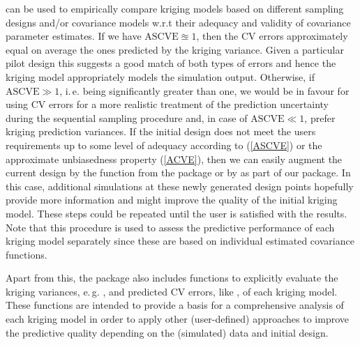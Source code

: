 \documentclass[article, nojss]{jss}
\numberwithin{equation}{section}			%
\begin{document}
can be used to empirically compare kriging models based on different sampling
designs and/or covariance models w.r.t their adequacy and validity of covariance
parameter estimates. If we have $\textrm{ASCVE}\approxeq 1$, then the CV errors
approximately equal on average the ones predicted by the kriging variance.
Given a particular pilot design this suggests a good match of both types of
errors and hence the kriging model appropriately models the simulation output.
Otherwise, if $\textrm{ASCVE}\gg 1$, i.\,e. being significantly greater than one, we would
be in favour for using CV errors for a more realistic treatment of the
prediction uncertainty during the sequential sampling procedure and, in case of
$\textrm{ASCVE}\ll 1$, prefer kriging prediction variances. If the initial
design does not meet the users requirements up to some level of adequacy
according to (\ref{ASCVE}) or the approximate unbiasedness property (\ref{ACVE}), then we can
easily augment the current design by the function  from the package  \citep{pkg:lhs} or
by  as part of our package. In this case, additional
simulations at these newly generated design points hopefully provide more
information and might improve the quality of the initial kriging model. These steps could be repeated
until the user is satisfied with the results. Note that this procedure is used to assess
the predictive performance of each kriging model separately since these
are based on individual estimated covariance functions.\par
%
Apart from this, the package also includes functions to explicitly evaluate the
kriging variances, e.\,g. , and predicted CV errors, like
\mbox{}, of each kriging model. These functions are
intended to provide a basis for a comprehensive analysis of each kriging model
in order to apply other (user-defined) approaches to improve the predictive quality
depending on the (simulated) data and initial design.
%
\end{document}
